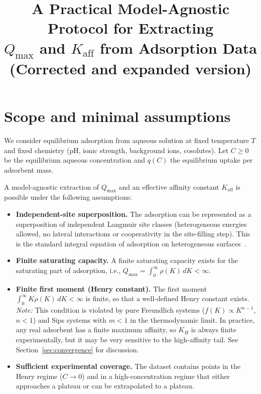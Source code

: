 \documentclass[12pt]{article}
\begin{document}
\title{A Practical Model-Agnostic Protocol for Extracting\\
$Q_{\max}$ and $K_{\mathrm{aff}}$ from Adsorption Data\\[6pt]
\large (Corrected and expanded version)}
\author{}
\date{}
\maketitle

\section{Scope and minimal assumptions}

We consider equilibrium adsorption from aqueous solution at fixed
temperature $T$ and fixed chemistry (pH, ionic strength, background ions,
cosolutes).  Let $C\ge 0$ be the equilibrium aqueous concentration and
$q(C)$ the equilibrium uptake per adsorbent mass.

A model-agnostic extraction of $Q_{\max}$ and an effective affinity
constant $K_{\mathrm{aff}}$ is possible under the following assumptions:

\begin{itemize}
  \item[A1.] \textbf{Independent-site superposition.}  The adsorption
        can be represented as a superposition of independent Langmuir
        site classes (heterogeneous energies allowed, no lateral
        interactions or cooperativity in the site-filling step).
        This is the standard integral equation of adsorption on
        heterogeneous surfaces~\cite{Sips1948,Jaroniec1988,Rudzinski1992}.
  \item[A2.] \textbf{Finite saturating capacity.}  A finite saturating
        capacity exists for the saturating part of adsorption, i.e.,
        $Q_{\max}=\int_0^\infty\rho(K)\,dK<\infty$.
  \item[A3.] \textbf{Finite first moment (Henry constant).}  The first
        moment $\int_0^\infty K\rho(K)\,dK<\infty$ is finite, so that a
        well-defined Henry constant exists.
        \emph{Note:} This condition is violated by pure Freundlich
        systems ($f(K)\propto K^{n-1}$, $n<1$) and Sips systems with
        $m<1$ in the thermodynamic limit.  In practice, any real
        adsorbent has a finite maximum affinity, so $K_H$ is always
        finite experimentally, but it may be very sensitive to the
        high-affinity tail.  See Section~\ref{sec:convergence} for
        discussion.
  \item[A4.] \textbf{Sufficient experimental coverage.}  The dataset
        contains points in the Henry regime ($C\to 0$) and in a
        high-concentration regime that either approaches a plateau or
        can be extrapolated to a plateau.
\end{itemize}
\end{document}
